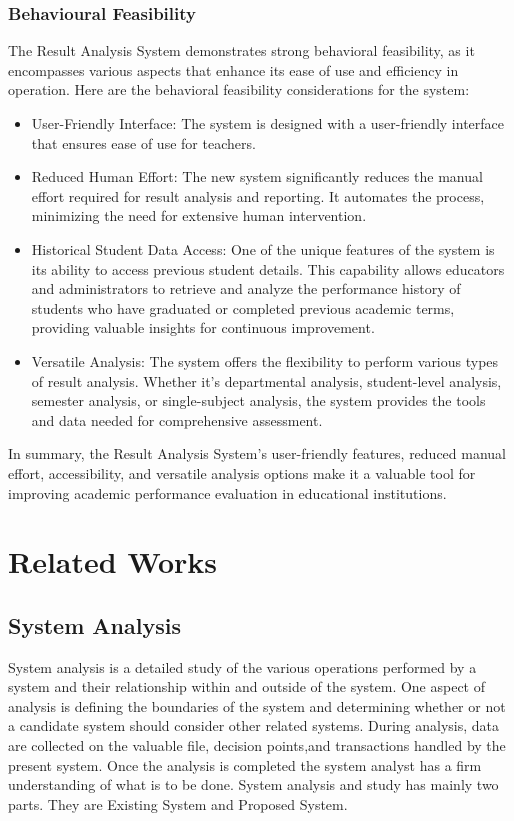 \documentclass{nascproject}
\begin{document}
    \subsection{Behavioural Feasibility}
    The Result Analysis System demonstrates strong behavioral feasibility, as it encompasses various aspects that enhance its ease of use and efficiency in operation. Here are the behavioral feasibility considerations for the system:
    \begin{itemize}
    	\item User-Friendly Interface: The system is designed with a user-friendly interface that ensures ease of use for teachers.
    	\item Reduced Human Effort: The new system significantly reduces the manual effort required for result analysis and reporting. It automates the process, minimizing the need for extensive human intervention. 
    	\item Historical Student Data Access: One of the unique features of the system is its ability to access previous student details. This capability allows educators and administrators to retrieve and analyze the performance history of students who have graduated or completed previous academic terms, providing valuable insights for continuous improvement.
    	\item Versatile Analysis: The system offers the flexibility to perform various types of result analysis. Whether it's departmental analysis, student-level analysis, semester analysis, or single-subject analysis, the system provides the tools and data needed for comprehensive assessment.
    \end{itemize}
    
    In summary, the Result Analysis System's user-friendly features, reduced manual effort, accessibility, and versatile analysis options make it a valuable tool for improving academic performance evaluation in educational institutions.
   
   
   

\chapter{Related Works}
\section{System Analysis}
System analysis is a detailed study of the various operations performed by a system
and their relationship within and outside of the system. One aspect of analysis is defining the
boundaries of the system and determining whether or not a candidate system should consider
other related systems. During analysis, data are collected on the valuable file, decision points,and transactions handled by the present system. Once the analysis is completed the system
analyst has a firm understanding of what is to be done. System analysis and study has mainly
two parts. They are Existing System and Proposed System.
\end{document}
